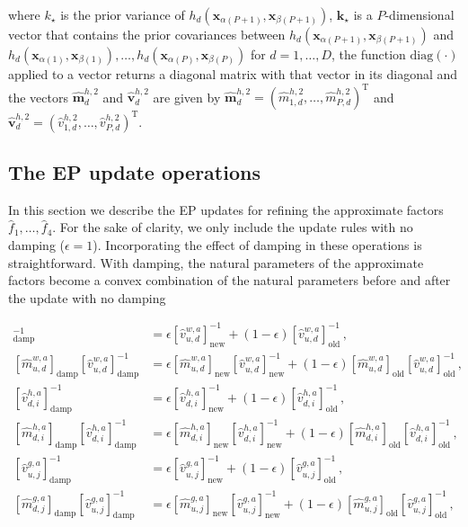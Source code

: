 where $k_\star$ is the prior variance of $h_d(\mathbf{x}_{\alpha(P+1)}, \mathbf{x}_{\beta(P+1)})$,
$\mathbf{k}_\star$ is a $P$-dimensional vector that contains the prior covariances between $h_d(\mathbf{x}_{\alpha(P+1)}, \mathbf{x}_{\beta(P+1)})$
and $h_d(\mathbf{x}_{\alpha(1)}, \mathbf{x}_{\beta(1)}),\ldots,h_d(\mathbf{x}_{\alpha(P)}, \mathbf{x}_{\beta(P)})$ for $d=1,\ldots,D$,
the function $\text{diag}(\cdot)$ applied to a vector returns a diagonal matrix with that vector in
its diagonal and the vectors $\hat{\mathbf{m}}_d^{h,2}$ and $\hat{\mathbf{v}}_d^{h,2}$ are given by
$\hat{\mathbf{m}}_d^{h,2}=(\hat{m}_{1,d}^{h,2},\ldots,\hat{m}_{P,d}^{h,2})^\text{T}$ and
$\hat{\mathbf{v}}_d^{h,2}=(\hat{v}_{1,d}^{h,2},\ldots,\hat{v}_{P,d}^{h,2})^\text{T}$.

\subsection{The EP update operations}

In this section we describe the EP updates for refining the approximate factors $\hat{f}_1,\ldots,\hat{f}_4$.
For the sake of clarity, we only include the update rules with no damping ($\epsilon = 1$).
Incorporating the effect of damping in these operations is straightforward. 
With damping,  the natural parameters of the approximate factors become 
a convex combination of the natural parameters before and after the 
update with no damping

\begin{align}
[\hat{v}_{u,d}^{w,a}]^{-1}_\text{damp} & = \epsilon [\hat{v}_{u,d}^{w,a}]^{-1}_\text{new}
+ (1 - \epsilon) [\hat{v}_{u,d}^{w,a}]^{-1}_\text{old}\,,\\
[\hat{m}_{u,d}^{w,a}]_\text{damp} [\hat{v}_{u,d}^{w,a}]_\text{damp}^{-1} & =
\epsilon [\hat{m}_{u,d}^{w,a}]_\text{new} [\hat{v}_{u,d}^{w,a}]_\text{new}^{-1} + (1 - \epsilon)
[\hat{m}_{u,d}^{w,a}]_\text{old}[\hat{v}_{u,d}^{w,a}]^{-1}_\text{old}\,,\\
[\hat{v}_{d,i}^{h,a}]^{-1}_\text{damp} & = \epsilon [\hat{v}_{d,i}^{h,a}]^{-1}_\text{new}
+ (1 - \epsilon) [\hat{v}_{d,i}^{h,a}]^{-1}_\text{old}\,,\\
[\hat{m}_{d,i}^{h,a}]_\text{damp} [\hat{v}_{d,i}^{h,a}]_\text{damp}^{-1} & =
\epsilon [\hat{m}_{d,i}^{h,a}]_\text{new} [\hat{v}_{d,i}^{h,a}]_\text{new}^{-1} + (1 - \epsilon)
[\hat{m}_{d,i}^{h,a}]_\text{old}[\hat{v}_{d,i}^{h,a}]^{-1}_\text{old}\,,\\
[\hat{v}_{u,j}^{g,a}]^{-1}_\text{damp} & = \epsilon [\hat{v}_{u,j}^{g,a}]^{-1}_\text{new}
+ (1 - \epsilon) [\hat{v}_{u,j}^{g,a}]^{-1}_\text{old}\,,\\
[\hat{m}_{d,j}^{g,a}]_\text{damp} [\hat{v}_{u,j}^{g,a}]_\text{damp}^{-1} & =
\epsilon [\hat{m}_{u,j}^{g,a}]_\text{new} [\hat{v}_{u,j}^{g,a}]_\text{new}^{-1} + (1 - \epsilon)
[\hat{m}_{u,j}^{g,a}]_\text{old}[\hat{v}_{u,j}^{g,a}]^{-1}_\text{old}\,,
\end{align}

